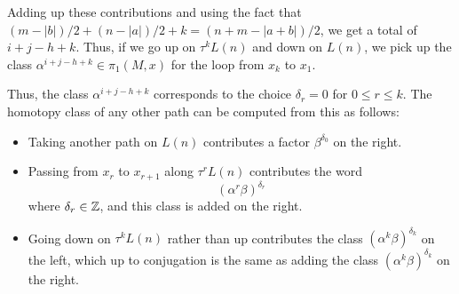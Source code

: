 \documentclass[12pt]{amsart}
\begin{document}
Adding up these contributions and using the fact that $(m-|b|)/2 +
(n-|a|)/2 + k = (n+m-|a+b|)/2$, we get a total of $i+j - h+ k$. Thus,
if we go up on $\tau^k L(n)$ and down on $L(n)$, we pick up the class
$\alpha^{i+j-h+k} \in \pi_1(M,x)$ for the loop from $x_k$ to $x_1$.

Thus, the class $\alpha^{i+j-h+k}$ corresponds to the choice
$\delta_r = 0$ for $0 \leq r \leq k$. The homotopy class of any
other path can be computed from this as follows:

\begin{itemize}

\item Taking another path on $L(n)$ contributes a factor
  $\beta^{\delta_0}$ on the right.

\item Passing from $x_{r}$ to $x_{r+1}$ along $\tau^r L(n)$
  contributes the word
  \begin{equation}
    (\alpha^r\beta)^{\delta_r}
  \end{equation}
  where $\delta_r \in \mathbb{Z}$, and this class is added on the right.

\item Going down on $\tau^kL(n)$ rather than up contributes
  the class $(\alpha^k\beta)^{\delta_k}$ on the left, which up to
  conjugation is the same as adding the class $(\alpha^k\beta)^{\delta_k}$ on the right.
\end{itemize}

\end{document}
